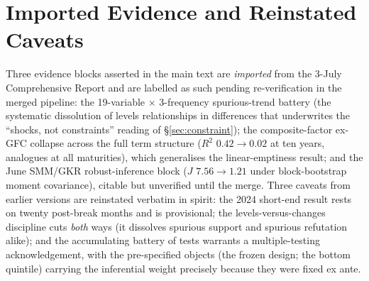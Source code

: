 \documentclass[11pt]{article}
\begin{document}
\section{Imported Evidence and Reinstated Caveats}

Three evidence blocks asserted in the main text are \emph{imported} from the 3-July Comprehensive Report and are labelled as such pending re-verification in the merged pipeline: the 19-variable $\times$ 3-frequency spurious-trend battery (the systematic dissolution of levels relationships in differences that underwrites the ``shocks, not constraints'' reading of \S\ref{sec:constraint}); the composite-factor ex-GFC collapse across the full term structure ($R^2$ $0.42\to0.02$ at ten years, analogues at all maturities), which generalises the linear-emptiness result; and the June SMM/GKR robust-inference block ($J$ $7.56\to1.21$ under block-bootstrap moment covariance), citable but unverified until the merge. Three caveats from earlier versions are reinstated verbatim in spirit: the 2024 short-end result rests on twenty post-break months and is provisional; the levels-versus-changes discipline cuts \emph{both} ways (it dissolves spurious support and spurious refutation alike); and the accumulating battery of tests warrants a multiple-testing acknowledgement, with the pre-specified objects (the frozen design; the bottom quintile) carrying the inferential weight precisely because they were fixed ex ante.
\end{document}
